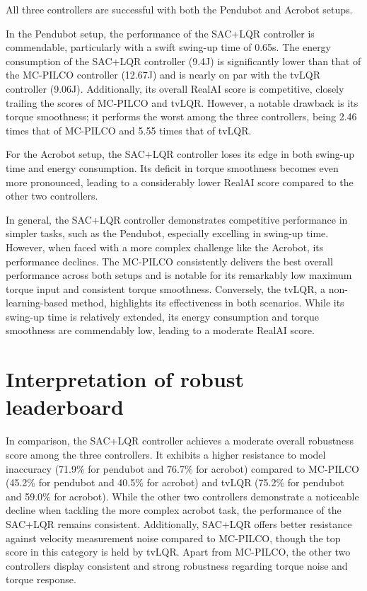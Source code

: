 All three controllers are successful with both the Pendubot and Acrobot setups.

In the Pendubot setup, the performance of the SAC+LQR controller is commendable, particularly with a swift swing-up time of 0.65s. The energy consumption of the SAC+LQR controller (9.4J) is significantly lower than that of the MC-PILCO controller (12.67J) and is nearly on par with the tvLQR controller (9.06J). Additionally, its overall RealAI score is competitive, closely trailing the scores of MC-PILCO and tvLQR. However, a notable drawback is its torque smoothness; it performs the worst among the three controllers, being 2.46 times that of MC-PILCO and 5.55 times that of tvLQR.

For the Acrobot setup, the SAC+LQR controller loses its edge in both swing-up time and energy consumption. Its deficit in torque smoothness becomes even more pronounced, leading to a considerably lower RealAI score compared to the other two controllers.

In general, the SAC+LQR controller demonstrates competitive performance in simpler tasks, such as the Pendubot, especially excelling in swing-up time. However, when faced with a more complex challenge like the Acrobot, its performance declines. The MC-PILCO consistently delivers the best overall performance across both setups and is notable for its remarkably low maximum torque input and consistent torque smoothness. Conversely, the tvLQR, a non-learning-based method, highlights its effectiveness in both scenarios. While its swing-up time is relatively extended, its energy consumption and torque smoothness are commendably low, leading to a moderate RealAI score.

\section{Interpretation of robust leaderboard}
In comparison, the SAC+LQR controller achieves a moderate overall robustness score among the three controllers. It exhibits a higher resistance to model inaccuracy (71.9\% for pendubot and 76.7\% for acrobot) compared to MC-PILCO (45.2\% for pendubot and 40.5\% for acrobot) and tvLQR (75.2\% for pendubot and 59.0\% for acrobot). While the other two controllers demonstrate a noticeable decline when tackling the more complex acrobot task, the performance of the SAC+LQR remains consistent. Additionally, SAC+LQR offers better resistance against velocity measurement noise compared to MC-PILCO, though the top score in this category is held by tvLQR. Apart from MC-PILCO, the other two controllers display consistent and strong robustness regarding torque noise and torque response.

